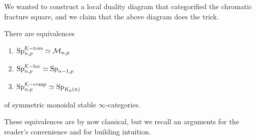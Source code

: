 We wanted to construct a local duality diagram that categorified the chromatic fracture square, and we claim that the above diagram does the trick. 

\begin{proposition}
    \label{ch0:prop:torsion-is-monochromatic}
    There are equivalences
    \begin{enumerate}
        \item $\mathrm{Sp}_{n,p}^{\mathcal{K}-\mathrm{tors}}\simeq \mathcal{M}_{n,p}$
        \item $\mathrm{Sp}_{n,p}^{\mathcal{K}-\mathrm{loc}}\simeq \mathrm{Sp}_{n-1,p}$
        \item $\mathrm{Sp}_{n,p}^{\mathcal{K}-\mathrm{comp}}\simeq \mathrm{Sp}_{{K_p(n)}}$
    \end{enumerate} 
    of symmetric monoidal stable $\infty$-categories. 
\end{proposition}

\begin{remark}
    These equivalences are by now classical, but we recall an arguments for the reader's convenience and for building intuition. 
\end{remark}


